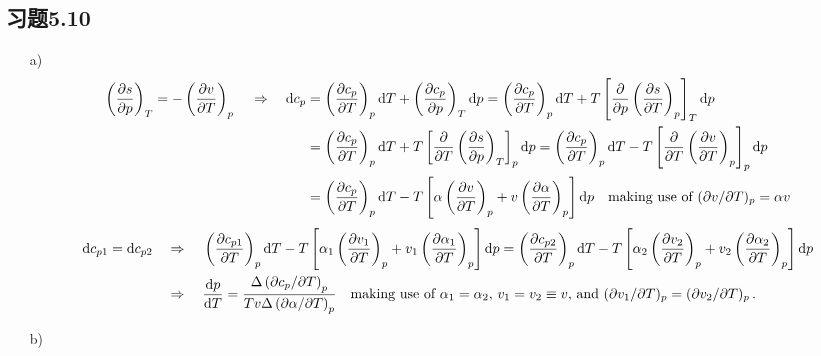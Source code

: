 \documentclass[letterpaper, 10pt]{article}
\begin{document}
\subsection{习题5.10}
\begin{itemize}
	\item[a)]
	\begin{align*}
    \left(\frac{\partial{s}}{\partial{p}}\right)_{T} = -\left(\frac{\partial{v}}{\partial{T}}\right)_{p} \quad{}\Rightarrow\quad{} {\rm{d}}c_{p} & = \left(\frac{\partial{c_{p}}}{\partial{T}}\right)_{p}{\rm{d}}T + \left(\frac{\partial{c_{p}}}{\partial{p}}\right)_{T}{\rm{d}}p = \left(\frac{\partial{c_{p}}}{\partial{T}}\right)_{p}{\rm{d}}T + T\left[\frac{\partial}{\partial{p}}\left(\frac{\partial{s}}{\partial{T}}\right)_{p}\right]_{T}{\rm{d}}p \\ & = \left(\frac{\partial{c_{p}}}{\partial{T}}\right)_{p}{\rm{d}}T + T\left[\frac{\partial}{\partial{T}}\left(\frac{\partial{s}}{\partial{p}}\right)_{T}\right]_{p}{\rm{d}}p = \left(\frac{\partial{c_{p}}}{\partial{T}}\right)_{p}{\rm{d}}T - T\left[\frac{\partial}{\partial{T}}\left(\frac{\partial{v}}{\partial{T}}\right)_{p}\right]_{p}{\rm{d}}p \\ & = \left(\frac{\partial{c_{p}}}{\partial{T}}\right)_{p}{\rm{d}}T - T\left[\alpha\left(\frac{\partial{v}}{\partial{T}}\right)_{p}+v\left(\frac{\partial{\alpha}}{\partial{T}}\right)_{p}\right]{\rm{d}}p \quad{} \text{making use of $(\partial{v}/\partial{T})_{p}=\alpha{v}$}
    \end{align*}
    \begin{align*}
    {\rm{d}}c_{p1}={\rm{d}}c_{p2} \quad{}&\Rightarrow\quad{} \left(\frac{\partial{c_{p1}}}{\partial{T}}\right)_{p}{\rm{d}}T - T\left[\alpha_{1}\left(\frac{\partial{v_{1}}}{\partial{T}}\right)_{p}+v_{1}\left(\frac{\partial{\alpha_{1}}}{\partial{T}}\right)_{p}\right]{\rm{d}}p = \left(\frac{\partial{c_{p2}}}{\partial{T}}\right)_{p}{\rm{d}}T - T\left[\alpha_{2}\left(\frac{\partial{v_{2}}}{\partial{T}}\right)_{p}+v_{2}\left(\frac{\partial{\alpha_{2}}}{\partial{T}}\right)_{p}\right]{\rm{d}}p \\ &\Rightarrow\quad{} \frac{{\rm{d}}p}{{\rm{d}}T} = \frac{\Delta\left(\partial{c_{p}}/\partial{T}\right)_{p}}{Tv\Delta\left(\partial{\alpha}/\partial{T}\right)_{p}} \quad{} \text{making use of $\alpha_{1}=\alpha_{2}$, $v_{1}=v_{2}\equiv{v}$, and $(\partial{v_{1}}/\partial{T})_{p}=(\partial{v_{2}}/\partial{T})_{p}$\,.}
    \end{align*}
	\item[b)]
	\begin{align*}

\end{align*}
\end{itemize}
\end{document}
